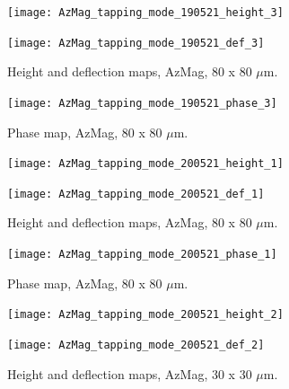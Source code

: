 \begin{figure}[H]
\centering
\begin{minipage}{.45\textwidth}
  \centering
  \texttt{[image: AzMag\_tapping\_mode\_190521\_height\_3]}
\end{minipage}
\begin{minipage}{.45\textwidth}
  \centering
  \texttt{[image: AzMag\_tapping\_mode\_190521\_def\_3]}
\end{minipage}
\caption[Height and deflection maps, AzMag]{Height and deflection maps, AzMag, 80 x 80 $\mu$m.}
\label{fig:afm_azmag_height_def_5}
\end{figure}

\begin{figure}[H]
\centering
  \texttt{[image: AzMag\_tapping\_mode\_190521\_phase\_3]}
\caption[Phase map, AzMag]{Phase map, AzMag, 80 x 80 $\mu$m.}
\label{fig:afm_azmag_phase_5}
\end{figure}


\begin{figure}[H]
\centering
\begin{minipage}{.45\textwidth}
  \centering
  \texttt{[image: AzMag\_tapping\_mode\_200521\_height\_1]}
\end{minipage}
\begin{minipage}{.45\textwidth}
  \centering
  \texttt{[image: AzMag\_tapping\_mode\_200521\_def\_1]}
\end{minipage}
\caption[Height and deflection maps, AzMag]{Height and deflection maps, AzMag, 80 x 80 $\mu$m.}
\label{fig:afm_azmag_height_def_6}
\end{figure}

\begin{figure}[H]
\centering
  \texttt{[image: AzMag\_tapping\_mode\_200521\_phase\_1]}
\caption[Phase map, AzMag]{Phase map, AzMag, 80 x 80 $\mu$m.}
\label{fig:afm_azmag_phase_6}
\end{figure}


\begin{figure}[H]
\centering
\begin{minipage}{.45\textwidth}
  \centering
  \texttt{[image: AzMag\_tapping\_mode\_200521\_height\_2]}
\end{minipage}
\begin{minipage}{.45\textwidth}
  \centering
  \texttt{[image: AzMag\_tapping\_mode\_200521\_def\_2]}
\end{minipage}
\caption[Height and deflection maps, AzMag]{Height and deflection maps, AzMag, 30 x 30 $\mu$m.}
\label{fig:afm_azmag_height_def_7}
\end{figure}

